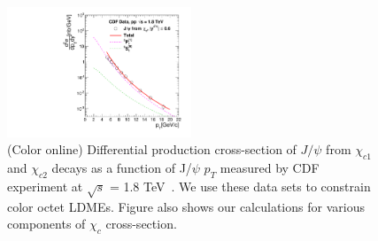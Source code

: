 \documentclass[aps,prc,preprint,superscriptaddress,showpacs,showkeys,amsmath]{revtex4-1}
\begin{document}
\begin{figure}
\includegraphics[width=0.49\textwidth]{Figures/Chic/Chic1_CDF_Fit.pdf}
\caption{(Color online) Differential production cross-section of $J/\psi$ from
$\chi_{c1}$ and $\chi_{c2}$ decays as a function of J/$\psi\,\,p_{T}$ measured by CDF experiment at $\sqrt{s}$ = 1.8 TeV~\cite{Abe:1997yz}. 
We use these data sets to constrain color octet LDMEs. Figure also shows our calculations for various components 
of $\chi_{c}$ cross-section.}
\label{Fig:LDMEChicCDF}
\end{figure}
\end{document}

